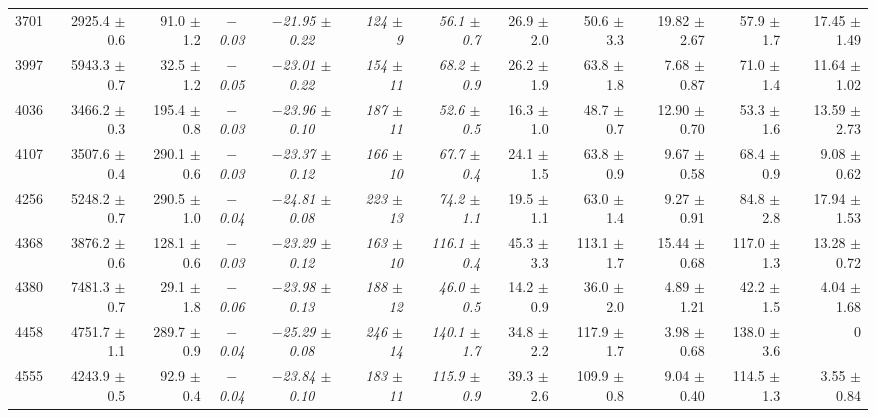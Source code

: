 \begin{table}
{\begin{tabular}{|rrrccrrrrrrr|}
  3701 &  2925.4 $\pm$ 0.6 &  91.0 $\pm$ 1.2 &{\it $-$0.03}&{\it $-$21.95 $\pm$ 0.22}&{\it 124 $\pm$ \phantom{1}9}&{\it  56.1 $\pm$ 0.7}& 26.9 $\pm$ 2.0  &  50.6 $\pm$ 3.3 & 19.82 $\pm$ 2.67 &  57.9 $\pm$ \phantom{1}1.7 & 17.45 $\pm$ \phantom{1}1.49  \\
  3997 &  5943.3 $\pm$ 0.7 &  32.5 $\pm$ 1.2 &{\it $-$0.05}&{\it $-$23.01 $\pm$ 0.22}&{\it 154 $\pm$           11}&{\it  68.2 $\pm$ 0.9}& 26.2 $\pm$ 1.9  &  63.8 $\pm$ 1.8 &  7.68 $\pm$ 0.87 &  71.0 $\pm$ \phantom{1}1.4 & 11.64 $\pm$ \phantom{1}1.02  \\
  4036 &  3466.2 $\pm$ 0.3 & 195.4 $\pm$ 0.8 &{\it $-$0.03}&{\it $-$23.96 $\pm$ 0.10}&{\it 187 $\pm$           11}&{\it  52.6 $\pm$ 0.5}& 16.3 $\pm$ 1.0  &  48.7 $\pm$ 0.7 & 12.90 $\pm$ 0.70 &  53.3 $\pm$ \phantom{1}1.6 & 13.59 $\pm$ \phantom{1}2.73  \\
  4107 &  3507.6 $\pm$ 0.4 & 290.1 $\pm$ 0.6 &{\it $-$0.03}&{\it $-$23.37 $\pm$ 0.12}&{\it 166 $\pm$           10}&{\it  67.7 $\pm$ 0.4}& 24.1 $\pm$ 1.5  &  63.8 $\pm$ 0.9 &  9.67 $\pm$ 0.58 &  68.4 $\pm$ \phantom{1}0.9 &  9.08 $\pm$ \phantom{1}0.62  \\
  4256 &  5248.2 $\pm$ 0.7 & 290.5 $\pm$ 1.0 &{\it $-$0.04}&{\it $-$24.81 $\pm$ 0.08}&{\it 223 $\pm$           13}&{\it  74.2 $\pm$ 1.1}& 19.5 $\pm$ 1.1  &  63.0 $\pm$ 1.4 &  9.27 $\pm$ 0.91 &  84.8 $\pm$ \phantom{1}2.8 & 17.94 $\pm$ \phantom{1}1.53  \\
  4368 &  3876.2 $\pm$ 0.6 & 128.1 $\pm$ 0.6 &{\it $-$0.03}&{\it $-$23.29 $\pm$ 0.12}&{\it 163 $\pm$           10}&{\it 116.1 $\pm$ 0.4}& 45.3 $\pm$ 3.3  & 113.1 $\pm$ 1.7 & 15.44 $\pm$ 0.68 & 117.0 $\pm$ \phantom{1}1.3 & 13.28 $\pm$ \phantom{1}0.72  \\
  4380 &  7481.3 $\pm$ 0.7 &  29.1 $\pm$ 1.8 &{\it $-$0.06}&{\it $-$23.98 $\pm$ 0.13}&{\it 188 $\pm$           12}&{\it  46.0 $\pm$ 0.5}& 14.2 $\pm$ 0.9  &  36.0 $\pm$ 2.0 &  4.89 $\pm$ 1.21 &  42.2 $\pm$ \phantom{1}1.5 &  4.04 $\pm$ \phantom{1}1.68  \\
  4458 &  4751.7 $\pm$ 1.1 & 289.7 $\pm$ 0.9 &{\it $-$0.04}&{\it $-$25.29 $\pm$ 0.08}&{\it 246 $\pm$           14}&{\it 140.1 $\pm$ 1.7}& 34.8 $\pm$ 2.2  & 117.9 $\pm$ 1.7 &  3.98 $\pm$ 0.68 & 138.0 $\pm$ \phantom{1}3.6 &            0\phantom{ 11.57} \\
  4555 &  4243.9 $\pm$ 0.5 &  92.9 $\pm$ 0.4 &{\it $-$0.04}&{\it $-$23.84 $\pm$ 0.10}&{\it 183 $\pm$           11}&{\it 115.9 $\pm$ 0.9}& 39.3 $\pm$ 2.6  & 109.9 $\pm$ 0.8 &  9.04 $\pm$ 0.40 & 114.5 $\pm$ \phantom{1}1.3 &  3.55 $\pm$ \phantom{1}0.84  \\

\end{tabular}}
\end{table}
